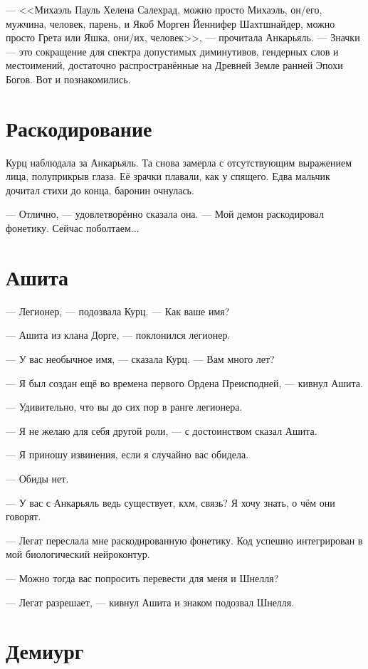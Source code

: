 \documentclass[a4paper,10pt,fleqn]{book}\usepackage{polyglossia}\setdefaultlanguage{english}\setotherlanguage{russian}\defaultfontfeatures{Ligatures=TeX,Mapping=tex-text}\usepackage{xcolor}\definecolor{lightgray}{HTML}{bbbbbb}\color{lightgray}\newcommand{\ml}[3]{\textcolor{black}{#3}}
\begin{document}
--- <<Михаэль Пауль Хелена Салехрад, можно просто Михаэль, он/его, мужчина, человек, парень, и Якоб Морген Йеннифер Шахтшнайдер, можно просто Грета или Яшка, они/их, человек>>, --- прочитала Анкарьяль.
--- Значки --- это сокращение для спектра допустимых диминутивов, гендерных слов и местоимений, достаточно распространённые на Древней Земле ранней Эпохи Богов.
Вот и познакомились.

\section{Раскодирование}

Курц наблюдала за Анкарьяль.
Та снова замерла с отсутствующим выражением лица, полуприкрыв глаза.
Её зрачки плавали, как у спящего.
Едва мальчик дочитал стихи до конца, баронин очнулась.

--- Отлично, --- удовлетворённо сказала она.
--- Мой демон раскодировал фонетику.
Сейчас поболтаем...

\section{Ашита}

--- Легионер, --- подозвала Курц.
--- Как ваше имя?

--- Ашита из клана Дорге, --- поклонился легионер.

--- У вас необычное имя, --- сказала Курц.
--- Вам много лет?

--- Я был создан ещё во времена первого Ордена Преисподней, --- кивнул Ашита.

--- Удивительно, что вы до сих пор в ранге легионера.

--- Я не желаю для себя другой роли, --- с достоинством сказал Ашита.

--- Я приношу извинения, если я случайно вас обидела.

--- Обиды нет.

--- У вас с Анкарьяль ведь существует, кхм, связь?
Я хочу знать, о чём они говорят.

--- Легат переслала мне раскодированную фонетику.
Код успешно интегрирован в мой биологический нейроконтур.

--- Можно тогда вас попросить перевести для меня и Шнелля?

--- Легат разрешает, --- кивнул Ашита и знаком подозвал Шнелля.

\section{Демиург}
\end{document}
